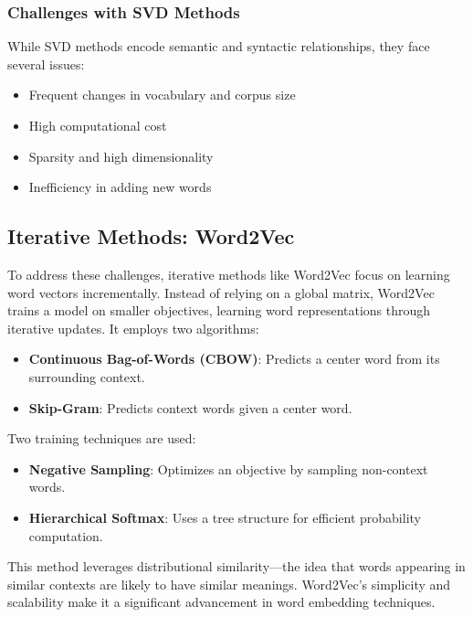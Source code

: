 \subsubsection{Challenges with SVD Methods}
While SVD methods encode semantic and syntactic relationships, they face several issues:
\begin{itemize}
    \item Frequent changes in vocabulary and corpus size
    \item High computational cost
    \item Sparsity and high dimensionality
    \item Inefficiency in adding new words
\end{itemize}

\subsection{Iterative Methods: Word2Vec}
To address these challenges, iterative methods like Word2Vec focus on learning word vectors incrementally. Instead of relying on a global matrix, Word2Vec trains a model on smaller objectives, learning word representations through iterative updates. It employs two algorithms:
\begin{itemize}
    \item \textbf{Continuous Bag-of-Words (CBOW)}: Predicts a center word from its surrounding context.
    \item \textbf{Skip-Gram}: Predicts context words given a center word.
\end{itemize}

Two training techniques are used:
\begin{itemize}
    \item \textbf{Negative Sampling}: Optimizes an objective by sampling non-context words.
    \item \textbf{Hierarchical Softmax}: Uses a tree structure for efficient probability computation.
\end{itemize}

This method leverages distributional similarity—the idea that words appearing in similar contexts are likely to have similar meanings. Word2Vec’s simplicity and scalability make it a significant advancement in word embedding techniques.

